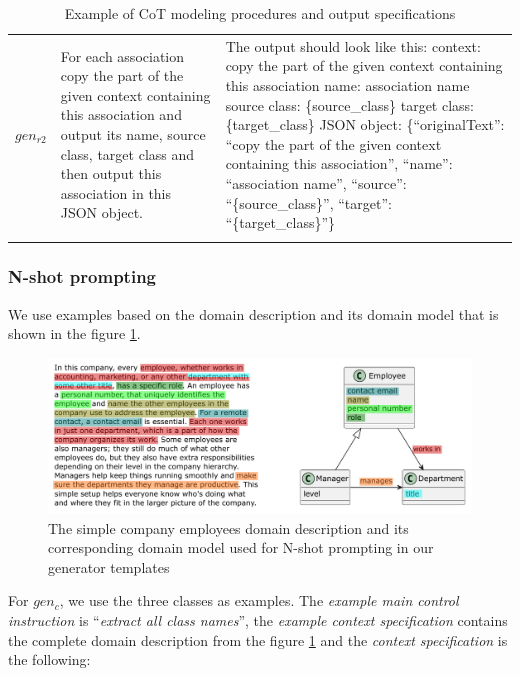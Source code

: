 \begin{table}[!h]
\begin{tabular}{@{}l>{\raggedright\arraybackslash}p{}>{\raggedright\arraybackslash}p{}@{}}
$gen_{r2}$ & For each association copy the part of the given context containing this association and output its name, source class, target class and then output this association in this JSON object. &
The output should look like this: \newline
context: copy the part of the given context containing this association \newline
name: association name \newline
source class: \{source\_class\} \newline
target class: \{target\_class\} \newline
JSON object: \{``originalText'': ``copy the part of the given context containing this association'', ``name'': ``association name'', ``source'': ``\{source\_class\}'', ``target'': ``\{target\_class\}''\} \\

	\addlinespace
	\bottomrule
	\addlinespace
	\end{tabular}
	\caption{Example of CoT modeling procedures and output specifications}
	\label{tab:cot-prompt-templates}
\end{table}


\subsubsection{N-shot prompting}

We use examples based on the domain description and its domain model that is shown in the figure \ref{fig:prompting-domain}.

\begin{figure}[!h]
    \centering
    \includegraphics[scale=0.6]{img/prompting-domain.pdf}
    \caption{\centering The simple company employees domain description and its corresponding domain model used for N-shot prompting in our generator templates}
    \label{fig:prompting-domain}
\end{figure}

For $gen_c$, we use the three classes as examples. The \emph{example main control instruction} is ``\textit{extract all class names}'', the \emph{example context specification} contains the complete domain description from the figure \ref{fig:prompting-domain} and the \emph{context specification} is the following: \\

